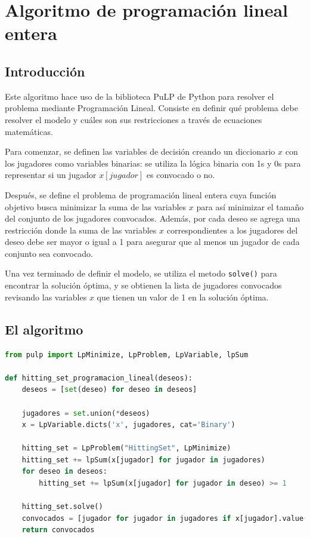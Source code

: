\documentclass{estilo}
\begin{document}
\newpage
\section{Algoritmo de programación lineal entera}

\subsection{Introducción}

Este algoritmo hace uso de la biblioteca PuLP de Python para resolver el problema mediante Programación Lineal. Consiste en definir qué problema debe resolver el modelo y cuáles son sus restricciones a través de ecuaciones matemáticas.

Para comenzar, se definen las variables de decisión creando un diccionario $x$ con los jugadores como variables binarias: se utiliza la lógica binaria con 1s y 0s para representar si un jugador $x[jugador]$ es convocado o no.

Después, se define el problema de programación lineal entera cuya función objetivo busca minimizar la suma de las variables $x$ para así minimizar el tamaño del conjunto de los jugadores convocados. Además, por cada deseo se agrega una restricción donde la suma de las variables $x$ correspondientes a los jugadores del deseo debe ser mayor o igual a 1 para asegurar que al menos un jugador de cada conjunto sea convocado.

Una vez terminado de definir el modelo, se utiliza el metodo \texttt{solve()} para encontrar la solución óptima, y se obtienen la lista de jugadores convocados revisando las variables $x$ que tienen un valor de 1 en la solución óptima.


\subsection{El algoritmo}

\begin{lstlisting}[language=Python]
from pulp import LpMinimize, LpProblem, LpVariable, lpSum

def hitting_set_programacion_lineal(deseos):
    deseos = [set(deseo) for deseo in deseos]

    jugadores = set.union(*deseos)
    x = LpVariable.dicts('x', jugadores, cat='Binary')
    
    hitting_set = LpProblem("HittingSet", LpMinimize)
    hitting_set += lpSum(x[jugador] for jugador in jugadores)
    for deseo in deseos:
        hitting_set += lpSum(x[jugador] for jugador in deseo) >= 1

    hitting_set.solve()
    convocados = [jugador for jugador in jugadores if x[jugador].value() == 1]
    return convocados
\end{lstlisting}
\end{document}
